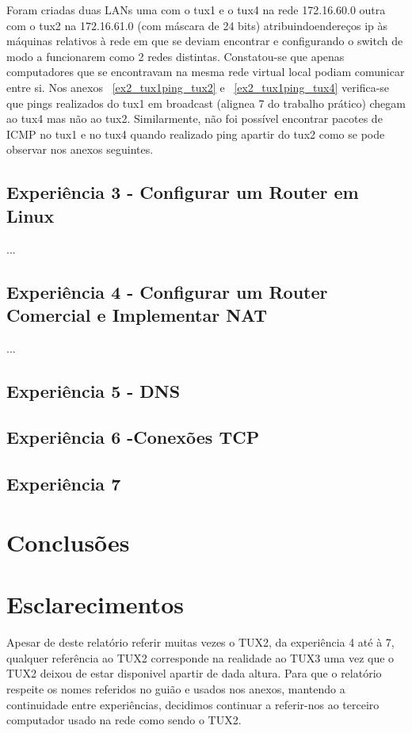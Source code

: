 \documentclass[11pt,a4paper,reqno]{report}
\numberwithin{equation}{section}
\begin{document}
Foram criadas duas LANs uma com o tux1 e o tux4 na rede 172.16.60.0 outra com o tux2 na 172.16.61.0 (com máscara de 24 bits) atribuindoendereços  ip às máquinas relativos à rede em que se deviam encontrar e configurando o switch de modo a funcionarem como 2 redes distintas. Constatou-se que apenas  computadores que se encontravam na mesma rede virtual local podiam comunicar entre si. Nos anexos ~\ref{ex2_tux1ping_tux2} e ~\ref{ex2_tux1ping_tux4} verifica-se que pings realizados do tux1 em broadcast (alignea 7 do trabalho prático) chegam ao tux4 mas não ao tux2. Similarmente, não foi possível encontrar pacotes de ICMP no tux1 e no tux4 quando realizado ping apartir do tux2 como se pode observar nos anexos seguintes.


\section{Experiência 3 - Configurar um Router em Linux}
...
\section{Experiência 4 - Configurar um Router Comercial e Implementar NAT}
...
\section{Experiência 5 - DNS}

\section{Experiência 6 -Conexões TCP}

\section{Experiência 7 }

\chapter{Conclusões}

\chapter{Esclarecimentos}

Apesar de deste relatório referir muitas vezes o TUX2, da experiência 4 até à 7, qualquer referência ao TUX2 corresponde na realidade ao TUX3 uma vez que o TUX2 deixou de estar disponivel apartir de dada altura. Para que o relatório respeite os nomes referidos no guião e usados nos anexos, mantendo a continuidade entre experiências, decidimos continuar a referir-nos ao terceiro computador usado na rede como sendo o TUX2.  
\end{document}
